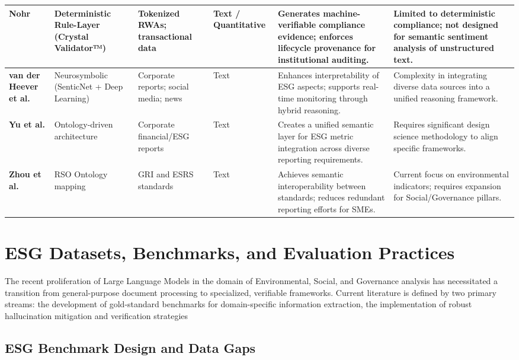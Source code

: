 \begin{landscape}
\begin{table}[p]
\begin{tabularx}{\linewidth}{|p{1.8cm}|p{3cm}|p{3cm}|p{1.8cm}|X|X|}
\textbf{Nohr } \parencite{steven_paul_nohr_a6874924} & Deterministic Rule-Layer (Crystal Validator™) & Tokenized RWAs; transactional data & Text / Quantitative & Generates machine-verifiable compliance evidence; enforces lifecycle provenance for institutional auditing. & Limited to deterministic compliance; not designed for semantic sentiment analysis of unstructured text. \\ \hline
\textbf{van der Heever et al. } \parencite{wihan_van_der_heever_5ff35709} & Neurosymbolic (SenticNet + Deep Learning) & Corporate reports; social media; news & Text & Enhances interpretability of ESG aspects; supports real-time monitoring through hybrid reasoning. & Complexity in integrating diverse data sources into a unified reasoning framework. \\ \hline
\textbf{Yu et al. } \parencite{mingqin_yu_96a5b8af} & Ontology-driven architecture & Corporate financial/ESG reports & Text & Creates a unified semantic layer for ESG metric integration across diverse reporting requirements. & Requires significant design science methodology to align specific frameworks. \\ \hline
\textbf{Zhou et al. } \parencite{yuchen_zhou_b6beee03} & RSO Ontology mapping & GRI and ESRS standards & Text & Achieves semantic interoperability between standards; reduces redundant reporting efforts for SMEs. & Current focus on environmental indicators; requires expansion for Social/Governance pillars. \\ \hline
\end{tabularx}
\end{table}
\end{landscape}


\section{ESG Datasets, Benchmarks, and Evaluation Practices}

The recent proliferation of Large Language Models in the domain of Environmental, Social, and Governance analysis has necessitated a transition from general-purpose document processing to specialized, verifiable frameworks. Current literature is defined by two primary streams: the development of gold-standard benchmarks for domain-specific information extraction, the implementation of robust hallucination mitigation and verification strategies
\subsection{ESG Benchmark Design and Data Gaps}

